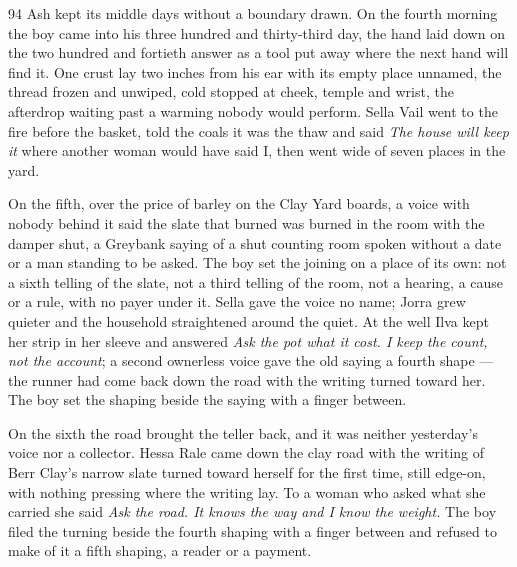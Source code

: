 
\scenebreak


\scenebreak


\scenebreak

\CRtailpiece
\begin{CRchronicle}{94}
Ash kept its middle days without a boundary drawn. On the fourth morning the boy came into his three hundred and thirty-third day, the hand laid down on the two hundred and fortieth answer as a tool put away where the next hand will find it. One crust lay two inches from his ear with its empty place unnamed, the thread frozen and unwiped, cold stopped at cheek, temple and wrist, the afterdrop waiting past a warming nobody would perform. Sella Vail went to the fire before the basket, told the coals it was the thaw and said \emph{The house will keep it} where another woman would have said I, then went wide of seven places in the yard.

On the fifth, over the price of barley on the Clay Yard boards, a voice with nobody behind it said the slate that burned was burned in the room with the damper shut, a Greybank saying of a shut counting room spoken without a date or a man standing to be asked. The boy set the joining on a place of its own: not a sixth telling of the slate, not a third telling of the room, not a hearing, a cause or a rule, with no payer under it. Sella gave the voice no name; Jorra grew quieter and the household straightened around the quiet. At the well Ilva kept her strip in her sleeve and answered \emph{Ask the pot what it cost. I keep the count, not the account}; a second ownerless voice gave the old saying a fourth shape --- the runner had come back down the road with the writing turned toward her. The boy set the shaping beside the saying with a finger between.

On the sixth the road brought the teller back, and it was neither yesterday’s voice nor a collector. Hessa Rale came down the clay road with the writing of Berr Clay’s narrow slate turned toward herself for the first time, still edge-on, with nothing pressing where the writing lay. To a woman who asked what she carried she said \emph{Ask the road. It knows the way and I know the weight.} The boy filed the turning beside the fourth shaping with a finger between and refused to make of it a fifth shaping, a reader or a payment.


\end{CRchronicle}
